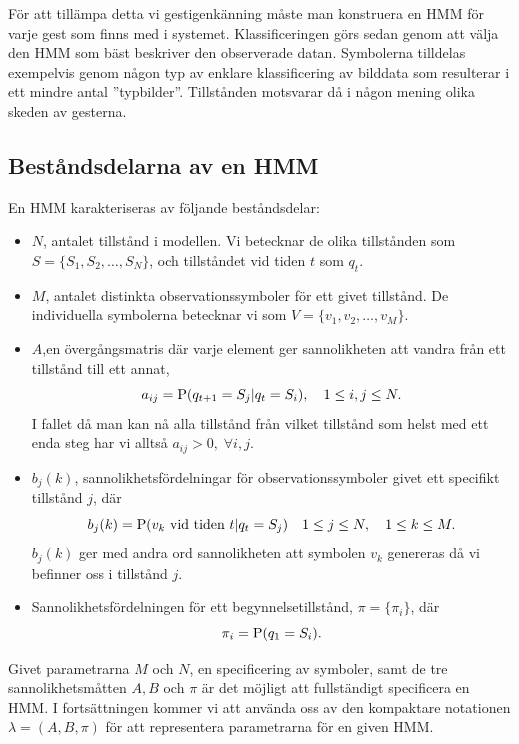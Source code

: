\documentclass[../rapport_MVEX01-11-05]{subfiles}
\begin{document}
För att tillämpa detta vi gestigenkänning måste man konstruera en HMM
för varje gest som finns med i systemet. Klassificeringen görs sedan genom
att välja den HMM som bäst beskriver den observerade datan. Symbolerna
tilldelas exempelvis genom någon typ av enklare klassificering av bilddata
som resulterar i ett mindre antal ''typbilder''. Tillstånden motsvarar
då i någon mening olika skeden av gesterna.


\subsection{Beståndsdelarna av en HMM}
En HMM karakteriseras av följande beståndsdelar:
\begin{itemize}
\item $N$, antalet tillstånd i modellen. Vi betecknar de olika
  tillstånden som $S = \{S_1, S_2, \dots, S_N\}$, och tillståndet vid
  tiden $t$ som $q_t$.
\item $M$, antalet distinkta observationssymboler för ett givet
  tillstånd. De individuella symbolerna betecknar vi som $V =
  \{v_1,v_2,\dots,v_M\}$.
\item $A$,en övergångsmatris där varje element ger sannolikheten att
  vandra från ett tillstånd till ett annat, 
\begin{equation*}
a_{ij} = \mathrm{P}(q_{t+1} = S_j|q_t = S_i),\quad 1 \leq i,j \leq N.
\end{equation*}
I fallet då man kan nå alla tillstånd från vilket tillstånd som helst
med ett enda steg har vi alltså $a_{ij} > 0,\;\forall i,j$. 
\item $b_j(k)$, sannolikhetsfördelningar för observationssymboler givet ett
  specifikt tillstånd $j$, där 
\begin{equation*}
b_j(k) = \mathrm{P}(v_k \text{ vid tiden } t|q_t = S_j) \quad 1 \leq j \leq N,\quad1 \leq k \leq M.
\end{equation*}
$b_j(k)$ ger med andra ord sannolikheten att symbolen $v_k$ genereras
då vi befinner oss i tillstånd $j$.
\item Sannolikhetsfördelningen för ett begynnelsetillstånd, $\pi =
  \{\pi_i\}$, där
\begin{equation*}
\pi_i = \mathrm{P}(q_1 = S_i).
\end{equation*}
\end{itemize}
Givet parametrarna $M$ och $N$, en specificering av symboler, samt de
tre sannolikhetsmåtten $A, B$ och $\pi$ är det möjligt att
fullständigt specificera en HMM. I fortsättningen kommer vi att
använda oss av den kompaktare notationen $\lambda = (A,B,\pi)$
för att representera parametrarna för en given HMM.
\end{document}

